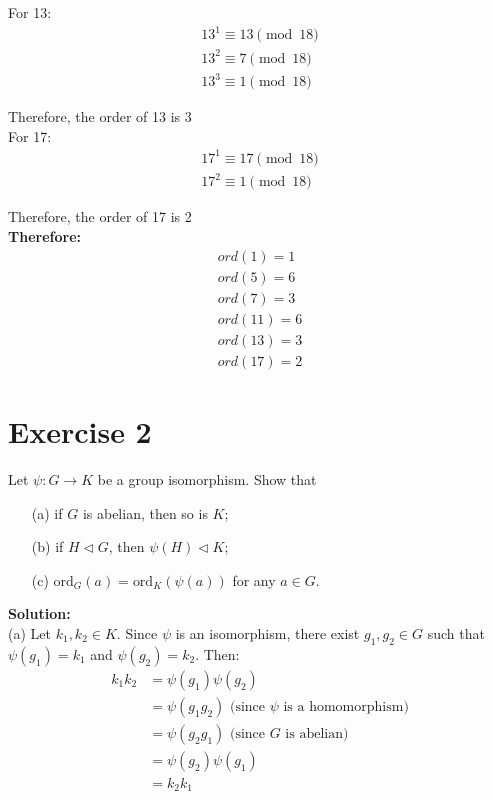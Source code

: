 \documentclass{article}
\begin{document}
For 13:
\begin{align*}
   13^1 \equiv 13 \pmod{18} \\
   13^2 \equiv 7 \pmod{18} \\
   13^3 \equiv 1 \pmod{18}
\end{align*}

Therefore, the order of 13 is 3 \\

For 17:
\begin{align*}
   17^1 \equiv 17 \pmod{18} \\
   17^2 \equiv 1 \pmod{18}
\end{align*}

Therefore, the order of 17 is 2 \\

\textbf{Therefore:}
\begin{align*}
    ord(1) = 1 \\
    ord(5) = 6 \\
    ord(7) = 3 \\
    ord(11) = 6 \\
    ord(13) = 3 \\
    ord(17) = 2
\end{align*}

\newpage

\section*{Exercise 2}
Let $\psi: G \to K$ be a group isomorphism. Show that
\begin{itemize}
\item[(a)] if $G$ is abelian, then so is $K$;
\item[(b)] if $H \triangleleft G$, then $\psi(H) \triangleleft K$;
\item[(c)] $\text{ord}_G(a) = \text{ord}_K(\psi(a))$ for any $a \in G$.
\end{itemize}

\textbf{Solution:} \\

(a) Let $k_1, k_2 \in K$. Since $\psi$ is an isomorphism, there exist $g_1, g_2 \in G$ such that $\psi(g_1) = k_1$ and $\psi(g_2) = k_2$.
Then:
\begin{align*}
k_1k_2 &= \psi(g_1)\psi(g_2) \\
&= \psi(g_1g_2) \text{ (since $\psi$ is a homomorphism)} \\
&= \psi(g_2g_1) \text{ (since $G$ is abelian)} \\
&= \psi(g_2)\psi(g_1) \\
&= k_2k_1
\end{align*}
\end{document}
